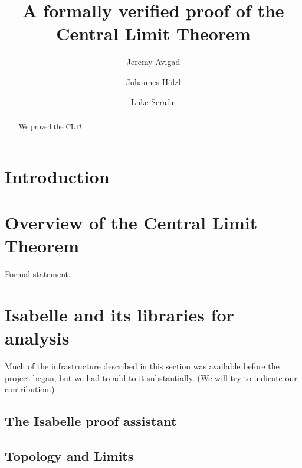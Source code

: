 \documentclass{svjour3}
\begin{document}
\title{A formally verified proof of the Central Limit Theorem}


\author{Jeremy Avigad \and Johannes H\"olzl \and Luke Serafin}



\maketitle


\begin{abstract}
We proved the CLT!
\end{abstract}


\section{Introduction}
\label{section:introduction}


\section{Overview of the Central Limit Theorem}
\label{section:overview}


Formal statement.

\section{Isabelle and its libraries for analysis}
\label{section:isabelle}

Much of the infrastructure described in this section was available before the project began, but we had to add to it substantially. (We will try to indicate our contribution.)

\subsection{The Isabelle proof assistant}

\subsection{Topology and Limits}
\end{document}
